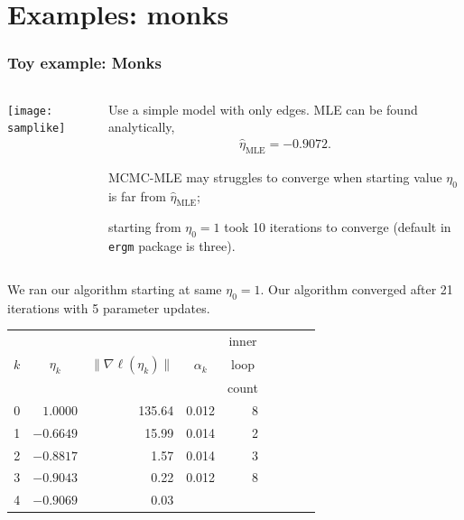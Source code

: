 \documentclass[ 10pt]{beamer}
\newcommand{\etaMLE}{\hat{\eta}_{\textrm{MLE}}}
\begin{document}
\section{Examples: monks}
\frame
{
  \frametitle{Toy example: Monks}  

\begin{columns}[t]
\begin{column}[T]{0.3\textwidth}
\texttt{[image: samplike]}
\end{column}

\begin{column}[r]{0.7\textwidth}
Use a simple model with only edges.  MLE can be 
found analytically,
\begin{align*}
	\etaMLE = -0.9072.
\end{align*}

\pause
MCMC-MLE may struggles to converge when
starting value $\eta_0$ is far from $\etaMLE$;

starting from $\eta_0 = 1$ took
10 iterations to converge (default in \texttt{ergm} package is three).
\end{column}
\end{columns}

\pause
We ran our algorithm starting at same $\eta_0=1$.  Our algorithm converged
after 21 iterations with 5 parameter updates.
{\footnotesize
\begin{table}
\begin{center}
\begin{tabular}{rrrrrrlrr}
  \hline
    &  &  &  & \multicolumn{1}{c}{inner}\\
  \multicolumn{1}{c}{$k$} & 
  \multicolumn{1}{c}{$\eta_k$} &
  \multicolumn{1}{c}{$\lVert \nabla \ell(\eta_k) \rVert$} &
  \multicolumn{1}{c}{$\alpha_k$} &
  \multicolumn{1}{c}{loop }\\
    &  &  &  & \multicolumn{1}{c}{count}\\
  \hline
   0 &  $1.0000$ & 135.64 &  0.012 & 8\\
   1 & $-0.6649$ & 15.99  &  0.014 & 2 \\
   2 & $-0.8817$ & 1.57   &  0.014 & 3 \\
   3 & $-0.9043$ & 0.22   &  0.012 & 8 \\
   4 & $-0.9069$ & 0.03   &  &  \\
   \hline
\end{tabular} \label{T:Sampson redo}
\end{center}
\end{table}}
}
\end{document}
